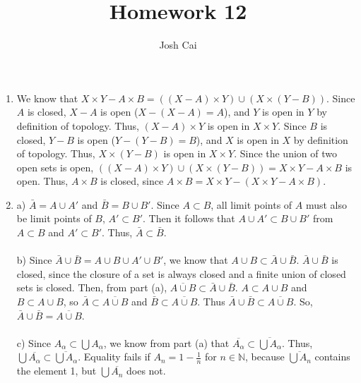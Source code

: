 \documentclass{article}
\begin{document}
\title{Homework 12}
\author{Josh Cai}

\maketitle
\begin{enumerate}
\item
We know that $X \times Y - A \times B = ((X-A) \times Y) \cup (X\times (Y-B))$. Since $A$ is closed, $X-A$ is open ($X-(X-A) = A$), and $Y$ is open in $Y$ by definition of topology. Thus, $(X-A) \times Y$ is open in $X \times Y$. Since $B$ is closed, $Y-B$ is open ($Y-(Y-B) = B$), and $X$ is open in $X$ by definition of topology. Thus, $X \times (Y-B)$ is open in $X \times Y$. Since the union of two open sets is open, $((X-A) \times Y) \cup (X\times (Y-B)) = X \times Y - A \times B$ is open. Thus, $A\times B$ is closed, since $A\times B = X\times Y-(X \times Y - A \times B)$.

\addtocounter{enumi}{1}
\item 
a) $\bar{A} = A \cup A'$ and $\bar{B} = B \cup B'$. Since $A \subset B$, all limit points of $A$ must also be limit points of $B$, $A' \subset B'$. Then it follows that $A \cup A' \subset B \cup B'$ from $A \subset B$ and $A' \subset B'$. Thus, $\bar{A} \subset \bar{B}$.
\\\\b) Since $\bar{A}\cup\bar{B} = A\cup B \cup A' \cup B'$, we know that $A\cup B \subset \bar{A}\cup\bar{B}$. $\bar{A}\cup\bar{B}$ is closed, since the closure of a set is always closed and a finite union of closed sets is closed. Then, from part (a), $\overline{A\cup B} \subset \bar{A}\cup\bar{B}$. $A \subset A\cup B$ and $B \subset A\cup B$, so $\bar{A} \subset \overline{A\cup B}$ and $\bar{B} \subset \overline{A\cup B}$. Thus $\bar{A}\cup\bar{B} \subset \overline{A\cup B}$. So, $\bar{A}\cup\bar{B} = \overline{A\cup B}$.
\\\\c) Since $A_{\alpha} \subset \bigcup A_{\alpha}$, we know from part (a) that $\overline{A_{\alpha}} \subset \overline{\bigcup A_{\alpha}}$. Thus, $\bigcup\overline{A_{\alpha}} \subset \overline{\bigcup A_{\alpha}}$. Equality fails if $A_n = 1-\frac{1}{n}$ for $n \in \mathbb{N}$, because $\overline{\bigcup A_n}$ contains the element 1, but $\bigcup\overline{A_n}$ does not.


\end{enumerate}
\end{document}
